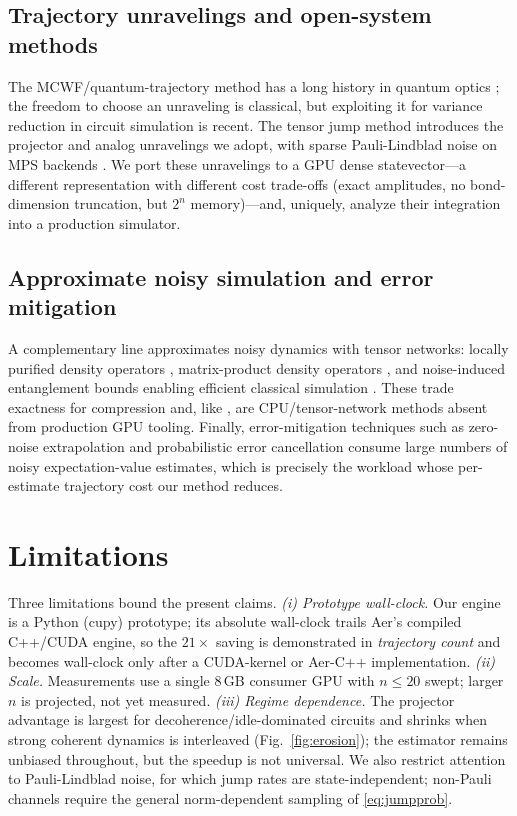 \documentclass{ieeeaccess}
\begin{document}
\subsection{Trajectory unravelings and open-system methods}
The MCWF/quantum-trajectory method has a long history in quantum optics
\cite{dalibard1992,molmer1993,plenio1998,breuer_petruccione,daley2014}; the freedom to choose an
unraveling is classical, but exploiting it for variance reduction in circuit simulation is recent.
The tensor jump method \cite{tjm2026} introduces the projector and analog unravelings we adopt,
with sparse Pauli-Lindblad noise \cite{sparse_pauli_lindblad2023} on MPS backends
\cite{vidal2003,cirac2021mps}. We port these unravelings to a GPU dense statevector---a different
representation with different cost trade-offs (exact amplitudes, no bond-dimension truncation, but
$2^n$ memory)---and, uniquely, analyze their integration into a production simulator.

\subsection{Approximate noisy simulation and error mitigation}
A complementary line approximates noisy dynamics with tensor networks: locally purified density
operators \cite{lpdo2023}, matrix-product density operators \cite{mpdo_prr,mpdo_tomography2025},
and noise-induced entanglement bounds enabling efficient classical simulation
\cite{noh2020,zhou2020}. These trade exactness for compression and, like \cite{tjm2026}, are
CPU/tensor-network methods absent from production GPU tooling. Finally, error-mitigation
techniques such as zero-noise extrapolation and probabilistic error cancellation
\cite{temme2017,sparse_pauli_lindblad2023} consume large numbers of noisy expectation-value
estimates, which is precisely the workload whose per-estimate trajectory cost our method reduces.

\section{Limitations}\label{sec:limitations}
Three limitations bound the present claims. \emph{(i) Prototype wall-clock.} Our engine is a Python
(cupy) prototype; its absolute wall-clock trails Aer's compiled C++/CUDA engine, so the $21\times$
saving is demonstrated in \emph{trajectory count} and becomes wall-clock only after a CUDA-kernel or
Aer-C++ implementation. \emph{(ii) Scale.} Measurements use a single $8$\,GB consumer GPU with $n\le20$
swept; larger $n$ is projected, not yet measured. \emph{(iii) Regime dependence.} The projector
advantage is largest for decoherence/idle-dominated circuits and shrinks when strong coherent dynamics
is interleaved (Fig.~\ref{fig:erosion}); the estimator remains unbiased throughout, but the speedup is
not universal. We also restrict attention to Pauli-Lindblad noise, for which jump rates are
state-independent; non-Pauli channels require the general norm-dependent sampling of \eqref{eq:jumpprob}.
\end{document}
